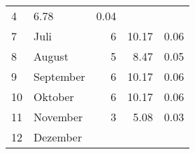 \begin{longtable}{lXrrr}
       \num{4} &
       \num[round-mode=places,round-precision=2]{6,78} &
         \num[round-mode=places,round-precision=2]{0,04} \\

     7 &
     \multicolumn{1}{X}{ Juli   } &


       \num{6} &
       \num[round-mode=places,round-precision=2]{10,17} &
         \num[round-mode=places,round-precision=2]{0,06} \\

     8 &
     \multicolumn{1}{X}{ August   } &


       \num{5} &
       \num[round-mode=places,round-precision=2]{8,47} &
         \num[round-mode=places,round-precision=2]{0,05} \\

     9 &
     \multicolumn{1}{X}{ September   } &


       \num{6} &
       \num[round-mode=places,round-precision=2]{10,17} &
         \num[round-mode=places,round-precision=2]{0,06} \\

     10 &
     \multicolumn{1}{X}{ Oktober   } &


       \num{6} &
       \num[round-mode=places,round-precision=2]{10,17} &
         \num[round-mode=places,round-precision=2]{0,06} \\

     11 &
     \multicolumn{1}{X}{ November   } &


       \num{3} &
       \num[round-mode=places,round-precision=2]{5,08} &
         \num[round-mode=places,round-precision=2]{0,03} \\

     12 &
     \multicolumn{1}{X}{ Dezember   } &



\end{longtable}
